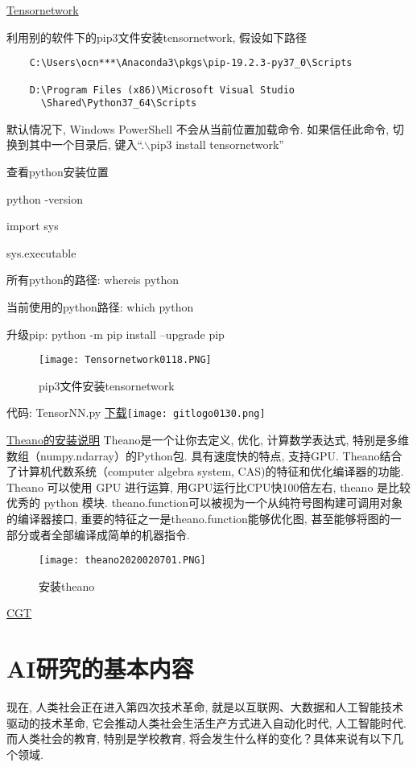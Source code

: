\href{https://github.com/google/TensorNetwork}{Tensornetwork}

利用别的软件下的pip3文件安装tensornetwork, 假设如下路径
\begin{Verbatim}
    C:\Users\ocn***\Anaconda3\pkgs\pip-19.2.3-py37_0\Scripts

    D:\Program Files (x86)\Microsoft Visual Studio
      \Shared\Python37_64\Scripts
\end{Verbatim}
默认情况下, Windows PowerShell 不会从当前位置加载命令. 如果信任此命令, 切换到其中一个目录后, 键入“.$\backslash$pip3 install tensornetwork”

查看python安装位置

\quad python -version

\quad import sys

\quad sys.executable

所有python的路径: whereis python

当前使用的python路径: which python

升级pip: python -m pip install --upgrade pip
\begin{figure}[htbp]
\centering
\texttt{[image: Tensornetwork0118.PNG]}
\caption{pip3文件安装tensornetwork}
\label{Tensornetwork0118}
\end{figure}

代码: TensorNN.py
\href{https://git-scm.com/download/win}{下载}\texttt{[image: gitlogo0130.png]}

\href{https://morvanzhou.github.io/tutorials/machine-learning/theano/}{Theano的安装说明}
Theano是一个让你去定义, 优化, 计算数学表达式, 特别是多维数组（numpy.ndarray）的Python包. 具有速度快的特点, 支持GPU. Theano结合了计算机代数系统（computer algebra system, CAS)的特征和优化编译器的功能.
Theano 可以使用 GPU 进行运算, 用GPU运行比CPU快100倍左右, theano 是比较优秀的 python 模块.
theano.function可以被视为一个从纯符号图构建可调用对象的编译器接口, 重要的特征之一是theano.function能够优化图, 甚至能够将图的一部分或者全部编译成简单的机器指令.
\begin{figure}[htbp]
\centering
\texttt{[image: theano2020020701.PNG]}
\caption{安装theano}
\label{theano2020020701}
\end{figure}

\href{http://rll.berkeley.edu/cgt/}{CGT}
\section{AI研究的基本内容}
现在, 人类社会正在进入第四次技术革命, 就是以互联网、大数据和人工智能技术驱动的技术革命, 它会推动人类社会生活生产方式进入自动化时代, 人工智能时代. 而人类社会的教育, 特别是学校教育, 将会发生什么样的变化？具体来说有以下几个领域.

